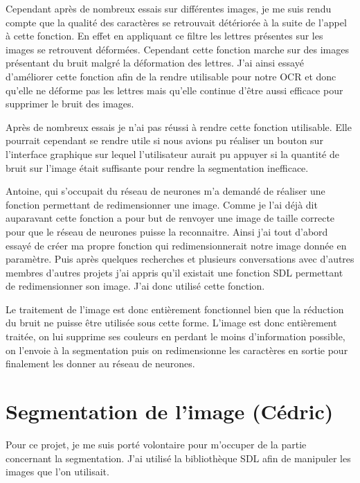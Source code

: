\documentclass[12pt]{report}
\begin{document}
Cependant après de nombreux essais sur différentes images, je me suis rendu compte que la qualité des caractères se retrouvait détériorée à la suite de l’appel à cette fonction. En effet en appliquant ce filtre les lettres présentes sur les images se retrouvent déformées. Cependant cette fonction marche sur des images présentant du bruit malgré la déformation des lettres. J’ai ainsi essayé d’améliorer cette fonction afin de la rendre utilisable pour notre OCR et donc qu’elle ne déforme pas les lettres mais qu’elle continue d’être aussi efficace pour supprimer le bruit des images. 

\newpage

Après de nombreux essais je n’ai pas réussi à rendre cette fonction utilisable. Elle pourrait cependant se rendre utile si nous avions pu réaliser un bouton sur l’interface graphique sur lequel l’utilisateur aurait pu appuyer si la quantité de bruit sur l’image était suffisante pour rendre la segmentation inefficace.

Antoine, qui s’occupait du réseau de neurones m’a demandé de réaliser une fonction permettant de redimensionner une image. Comme je l’ai déjà dit auparavant cette fonction a pour but de renvoyer une image de taille correcte pour que le réseau de neurones puisse la reconnaitre. Ainsi j’ai tout d’abord essayé de créer ma propre fonction qui redimensionnerait notre image donnée en paramètre. Puis après quelques recherches et plusieurs conversations avec d’autres membres d’autres projets j’ai appris qu’il existait une fonction SDL permettant de redimensionner son image. J’ai donc utilisé cette fonction.

Le traitement de l’image est donc entièrement fonctionnel bien que la réduction du bruit ne puisse être utilisée sous cette forme. L’image est donc entièrement traitée, on lui supprime ses couleurs en perdant le moins d’information possible, on l’envoie à la segmentation puis on redimensionne les caractères en sortie pour finalement les donner au réseau de neurones.

\newpage

\section{Segmentation de l'image (Cédric)}

Pour ce projet, je me suis porté volontaire pour m'occuper de la partie concernant la segmentation. J'ai utilisé la bibliothèque SDL afin de manipuler les images que l'on utilisait.
\end{document}
